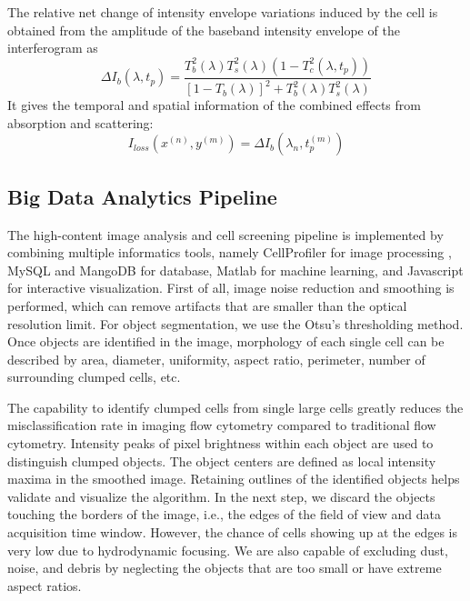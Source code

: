 \documentclass[aps,pra,reprint,superscriptaddress]{revtex4-1}
\begin{document}
The relative net change of intensity envelope variations induced by the cell is obtained from the amplitude of the baseband intensity envelope of the interferogram as
\begin{equation}
\Delta I_b(\lambda, t_p) = \frac{T_b^2(\lambda) T_s^2(\lambda) (1 - T_c^2(\lambda, t_p))}{[1-T_b(\lambda)]^2 + T_b^2(\lambda) T_s^2(\lambda)}
\end{equation}
It gives the temporal and spatial information of the combined effects from absorption and scattering:
\begin{equation}
I_{loss}(x^{(n)}, y^{(m)}) = \Delta I_b(\lambda_n, t_p^{(m)})
\end{equation}

\subsection*{Big Data Analytics Pipeline}

The high-content image analysis and cell screening pipeline is implemented by combining multiple informatics tools, namely CellProfiler for image processing \cite{carpenter2006cellprofiler,kamentsky2011improved}, MySQL and MangoDB for database, Matlab for machine learning, and Javascript for interactive visualization. First of all, image noise reduction and smoothing is performed, which can remove artifacts that are smaller than the optical resolution limit. For object segmentation, we use the Otsu's thresholding method. Once objects are identified in the image, morphology of each single cell can be described by area, diameter, uniformity, aspect ratio, perimeter, number of surrounding clumped cells, etc.

The capability to identify clumped cells from single large cells greatly reduces the misclassification rate in imaging flow cytometry compared to traditional flow cytometry. Intensity peaks of pixel brightness within each object are used to distinguish clumped objects. The object centers are defined as local intensity maxima in the smoothed image. Retaining outlines of the identified objects helps validate and visualize the algorithm. In the next step, we discard the objects touching the borders of the image, i.e., the edges of the field of view and data acquisition time window. However, the chance of cells showing up at the edges is very low due to hydrodynamic focusing. We are also capable of excluding dust, noise, and debris by neglecting the objects that are too small or have extreme aspect ratios.
\end{document}
